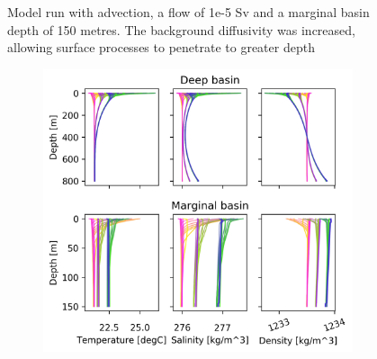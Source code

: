 \documentclass[twocolumn]{article}
\begin{document}
\begin{figure}
\begin{subfigure}[h]{0.20\textwidth}
\end{subfigure}\hfill
\caption{Model run with advection, a flow of 1e-5 Sv and a marginal basin depth of 150 metres. The background diffusivity was increased, allowing surface processes to penetrate to greater depth}
\label{fig:high_db_success}
\end{figure}

\begin{figure}
\centering
\begin{subfigure}[h]{0.70\textwidth}
\centering
\includegraphics[width=\linewidth,keepaspectratio]{001_net_evap_40yr_3steps_V2.png}
\end{subfigure}\hfill
\begin{subfigure}[h]{0.20\textwidth}
\centering

\end{subfigure}
\end{figure}
\end{document}
